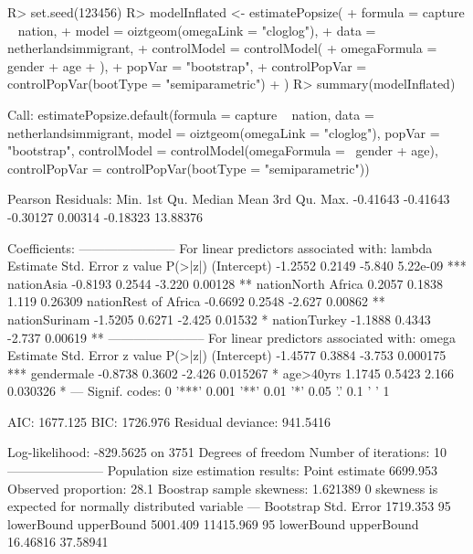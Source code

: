\documentclass[
]{jss}
\newcommand{\1}{\mathcal{I}} \newcommand{\bZero}{\boldsymbol{0}}
\begin{document}
\begin{CodeChunk}
\begin{CodeInput}
R> set.seed(123456)
R> modelInflated <- estimatePopsize(
+     formula = capture ~ nation,
+     model   = oiztgeom(omegaLink = "cloglog"),
+     data    = netherlandsimmigrant,
+     controlModel = controlModel(
+         omegaFormula = ~ gender + age
+     ),
+     popVar = "bootstrap",
+     controlPopVar = controlPopVar(bootType = "semiparametric")
+ )
R> summary(modelInflated)
\end{CodeInput}
\begin{CodeOutput}

Call:
estimatePopsize.default(formula = capture ~ nation, data = netherlandsimmigrant, 
    model = oiztgeom(omegaLink = "cloglog"), popVar = "bootstrap", 
    controlModel = controlModel(omegaFormula = ~gender + age), 
    controlPopVar = controlPopVar(bootType = "semiparametric"))

Pearson Residuals:
    Min.  1st Qu.   Median     Mean  3rd Qu.     Max. 
-0.41643 -0.41643 -0.30127  0.00314 -0.18323 13.88376 

Coefficients:
-----------------------
For linear predictors associated with: lambda 
                     Estimate Std. Error z value  P(>|z|)    
(Intercept)           -1.2552     0.2149  -5.840 5.22e-09 ***
nationAsia            -0.8193     0.2544  -3.220  0.00128 ** 
nationNorth Africa     0.2057     0.1838   1.119  0.26309    
nationRest of Africa  -0.6692     0.2548  -2.627  0.00862 ** 
nationSurinam         -1.5205     0.6271  -2.425  0.01532 *  
nationTurkey          -1.1888     0.4343  -2.737  0.00619 ** 
-----------------------
For linear predictors associated with: omega 
            Estimate Std. Error z value  P(>|z|)    
(Intercept)  -1.4577     0.3884  -3.753 0.000175 ***
gendermale   -0.8738     0.3602  -2.426 0.015267 *  
age>40yrs     1.1745     0.5423   2.166 0.030326 *  
---
Signif. codes:  0 '***' 0.001 '**' 0.01 '*' 0.05 '.' 0.1 ' ' 1

AIC: 1677.125
BIC: 1726.976
Residual deviance: 941.5416

Log-likelihood: -829.5625 on 3751 Degrees of freedom 
Number of iterations: 10
-----------------------
Population size estimation results: 
Point estimate 6699.953
Observed proportion: 28.1%
Boostrap sample skewness: 1.621389
0 skewness is expected for normally distributed variable
---
Bootstrap Std. Error 1719.353
95%
lowerBound upperBound 
  5001.409  11415.969 
95%
lowerBound upperBound 
  16.46816   37.58941 
\end{CodeOutput}
\end{CodeChunk}
\end{document}
